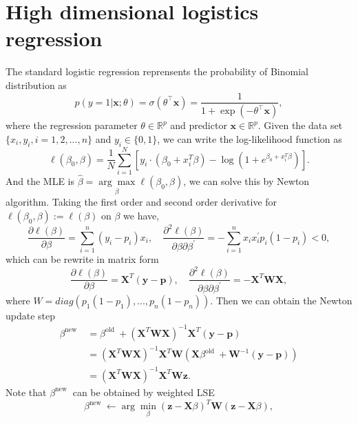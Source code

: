 \section{High dimensional logistics regression}
The standard logistic regression reprensents the probability of Binomial distribution as 
\begin{equation}\label{3.1}
p(y=1 | \mathbf{x} ; \theta)=\sigma\left(\theta^{\top} \mathbf{x}\right)=\frac{1}{1+\exp \left(-\theta^{\top} \mathbf{x}\right)},
\end{equation}
where the regression parameter $\theta \in \mathbb{R}^p$ and predictor $\mathbf{x}\in \mathbb{R}^p$.
Given the data set $\{x_i, y_i, i=1,2,...,n\}$ and $y_i\in \{0, 1\}$, we can write the log-likelihood function as
\begin{equation}\label{3.2}
\ell\left(\beta_{0}, \beta\right)=\frac{1}{N} \sum_{i=1}^{N}\left[y_{i} \cdot\left(\beta_{0}+x_{i}^{T} \beta\right)-\log \left(1+e^{\beta_{0}+x_{i}^{T} \beta}\right)\right].
\end{equation}
And the MLE is $\hat{\beta}=\underset{\beta}{\arg \max } \ell\left(\beta_{0}, \beta\right)$, we can solve this by Newton algorithm. Taking the first order and second order derivative for $\ell\left(\beta_{0}, \beta\right) := \ell(\beta)$ on $\beta$ we have,
$$
\frac{\partial \ell(\beta)}{\partial \beta}=\sum_{i=1}^{n}\left(y_{i}-p_{i}\right) x_{i}, \quad \frac{\partial^{2} \ell(\beta)}{\partial \beta \partial \beta^{\prime}}=-\sum_{i=1}^{n} x_{i} x_{i}^{\prime} p_{i}\left(1-p_{i}\right)<0,
$$
which can be rewrite in matrix form
$$
\frac{\partial \ell(\beta)}{\partial \beta}=\mathbf{X}^T(\mathbf{y}-\mathbf{p}), \quad  \frac{\partial^{2} \ell(\beta)}{\partial \beta \partial \beta^{\prime}} = -\mathbf{X}^T\mathbf{WX},
$$
where $W=diag\left(p_1(1-p_1),...,p_n(1-p_n)\right)$.
Then we can obtain the Newton update step 
\begin{align*}
\beta^{\text {new }} &=\beta^{\text {old }}+\left(\mathbf{X}^{T} \mathbf{W} \mathbf{X}\right)^{-1} \mathbf{X}^{T}(\mathbf{y}-\mathbf{p}) \\
&=\left(\mathbf{X}^{T} \mathbf{W} \mathbf{X}\right)^{-1} \mathbf{X}^{T} \mathbf{W}\left(\mathbf{X} \beta^{\text {old }}+\mathbf{W}^{-1}(\mathbf{y}-\mathbf{p})\right) \\ 
&=\left(\mathbf{X}^{T} \mathbf{W} \mathbf{X}\right)^{-1} \mathbf{X}^{T} \mathbf{W} \mathbf{z}.
\end{align*}
Note that $\beta^{\text {new }}$ can be obtained by weighted LSE
\begin{equation}
\beta^{\text {new }} \leftarrow \arg \min _{\beta}(\mathbf{z}-\mathbf{X} \beta)^{T} \mathbf{W}(\mathbf{z}-\mathbf{X} \beta),
\end{equation}
